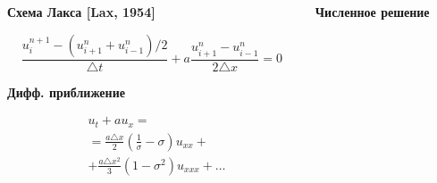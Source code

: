 \documentclass[10pt,xcolor=pst,aspectratio=169]{beamer}
\begin{document}
\begin{frame}{}

    \transdissolve[duration=0.1]
    \justifying
    \large



    \begin{columns}
        \begin{column}[T]{0.5\textwidth}
            \begin{center}
                \textbf{Схема Лакса [Lax, 1954]}
            \end{center}
            \[
                \frac{u^{n + 1}_{i} - (u^{n}_{i+1} + u^{n}_{i-1}) / 2}{\triangle t} + a \frac{u^{n}_{i + 1} - u^{n}_{i - 1}}{2 \triangle x} = 0
            \]
            \begin{center}
                \textbf{Дифф. приближение}
            \end{center}
            \[
                \begin{split}
                    &u_{t} + a u_{x} =\\
                    &= \frac{a \triangle x}{2} \left( \frac{1}{\sigma}- \sigma \right) \boxed{u_{xx}} +\\
                    &+ \frac{a \triangle x^{2}}{3} (1 - \sigma^{2}) \boxed{u_{xxx}} + \ldots
                \end{split}
            \]
        \end{column}
        \begin{column}[T]{0.5\textwidth}
            \begin{center}
                \textbf{Численное решение}
            \end{center}
            \begin{center}
                 \begin{center}
                \end{center}
            \end{center}
        \end{column}
    \end{columns}

\end{frame}
\end{document}
